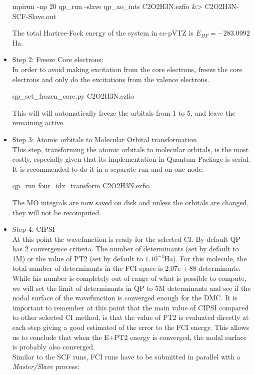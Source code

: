 \begin{itemize}
\begin{shade}
mpirun -np 20 qp_run -slave qp_ao_ints C2O2H3N.ezfio &> C2O2H3N-SCF-Slave.out 
\end{shade}
The total Hartree-Fock energy of the system in cc-pVTZ is \textit{$E_{HF}=-283.0992$}Ha.\\ 
\item Step 2: Freeze Core electrons:\\
In order to avoid making excitation from the core electrons, freeze the core electrons and only do the excitations from the valence electrons.\\  
\begin{shade}
qp_set_frozen_core.py C2O2H3N.ezfio
\end{shade}
This will will automatically freeze the orbitals from 1 to 5, and leave the remaining active. \\
\item Step 3: Atomic orbitals to Molecular Orbital transformation\\
This step, transforming the atomic orbitals to molecular orbitals, is the most costly, especially given that its implementation in Quantum Package is serial. It is recommended to do it in a separate run and on one node.\\
\begin{shade}
qp_run four_idx_transform C2O2H3N.ezfio
\end{shade}

The MO integrals are now saved on disk and unless the orbitals are changed, they will not be recomputed.\\
\item Step 4: CIPSI \\
At this point the wavefunction is ready for the selected CI. By default QP has 2 convergence criteria. The number of determinants (set by default to 1M) or the value of PT2 (set by default to $1.10^{-4}$Ha). For this molecule, the total number of determinants in the FCI space is $2.07e+88$ determinants. While his number is completely out of range of what is possible to compute, we will set the limit of determinants in QP to 5M determinants and see if the nodal surface of the wavefunction is converged enough for the DMC. It is important to remember at this point that the main value of CIPSI compared to other selected CI method, is that the value of PT2 is evaluated directly at each step giving a good estimated of the error to the FCI energy. This allows us to conclude that when the E+PT2 energy is converged, the nodal surface is probably also converged.\\
Similar to the SCF runs, FCI runs have to be submitted in parallel with a \textit{Master/Slave} process:\\


\end{itemize}
